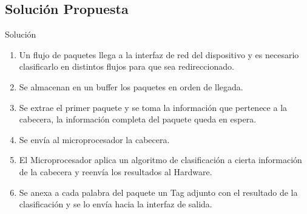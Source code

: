 \documentclass[xcolor=dvipsnames]{beamer}
\begin{document}
\subsection{Solución Propuesta}
\begin{frame}{Solución}

    \begin{enumerate}
      \scriptsize
 \pause     	\item Un flujo de paquetes llega a la interfaz de red del dispositivo y es necesario clasificarlo en distintos flujos para que sea redireccionado.
\pause 	\item Se almacenan en un buffer los paquetes en orden de llegada.
\pause 	\item Se extrae el primer paquete y se toma la información que pertenece a la cabecera, la información completa del paquete queda en espera.
\pause 	\item Se envía al microprocesador la cabecera. 
\pause 	\item El Microprocesador aplica un algoritmo de clasificación a cierta información de la cabecera y reenvía los resultados al Hardware. 
\pause 	\item Se anexa a cada palabra del paquete un Tag adjunto con el resultado de la clasificación y se lo envía hacia la interfaz de salida.
    \end{enumerate}

\end{frame}
\end{document}
